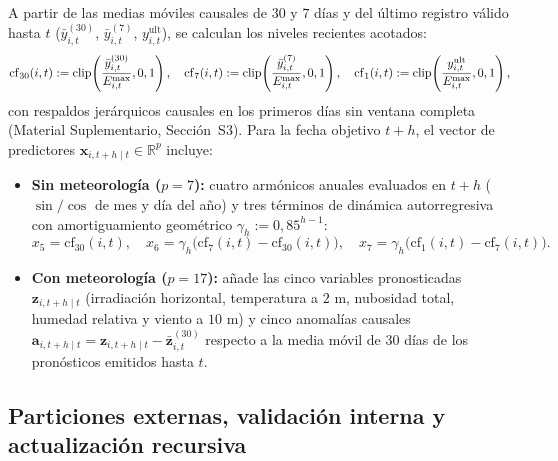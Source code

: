 A partir de las medias móviles causales de $30$ y $7$ días y del último registro válido hasta $t$ ($\bar{y}^{(30)}_{i,t}$, $\bar{y}^{(7)}_{i,t}$, $y^{\mathrm{ult}}_{i,t}$), se calculan los niveles recientes acotados:
\begin{equation}
\mathrm{cf}_{30}(i,t) := \operatorname{clip}\!\left(\frac{\bar{y}^{(30)}_{i,t}}{E^{\max}_{i,t}}, 0, 1\right),\quad
\mathrm{cf}_{7}(i,t) := \operatorname{clip}\!\left(\frac{\bar{y}^{(7)}_{i,t}}{E^{\max}_{i,t}}, 0, 1\right),\quad
\mathrm{cf}_{1}(i,t) := \operatorname{clip}\!\left(\frac{y^{\mathrm{ult}}_{i,t}}{E^{\max}_{i,t}}, 0, 1\right),
\label{eq:cf_hist}
\end{equation}
con respaldos jerárquicos causales en los primeros días sin ventana completa (Material Suplementario, Sección~S3). Para la fecha objetivo $t+h$, el vector de predictores $\mathbf{x}_{i,t+h \mid t} \in \mathbb{R}^p$ incluye:
\begin{itemize}
    \item \textbf{Sin meteorología ($p = 7$):} cuatro armónicos anuales evaluados en $t+h$ ($\sin/\cos$ de mes y día del año) y tres términos de dinámica autorregresiva con amortiguamiento geométrico $\gamma_h := 0{,}85^{h-1}$:
    \begin{equation}
    x_5 = \mathrm{cf}_{30}(i,t),\quad
    x_6 = \gamma_h \big(\mathrm{cf}_{7}(i,t) - \mathrm{cf}_{30}(i,t)\big),\quad
    x_7 = \gamma_h \big(\mathrm{cf}_{1}(i,t) - \mathrm{cf}_{7}(i,t)\big).
    \label{eq:features_din}
    \end{equation}
    \item \textbf{Con meteorología ($p = 17$):} añade las cinco variables pronosticadas $\mathbf{z}_{i,t+h \mid t}$ (irradiación horizontal, temperatura a $2\text{ m}$, nubosidad total, humedad relativa y viento a $10\text{ m}$) y cinco anomalías causales $\mathbf{a}_{i,t+h \mid t} = \mathbf{z}_{i,t+h \mid t} - \bar{\mathbf{z}}^{(30)}_{i,t}$ respecto a la media móvil de $30$ días de los pronósticos emitidos hasta $t$.
\end{itemize}

\subsection{Particiones externas, validación interna y actualización recursiva}

